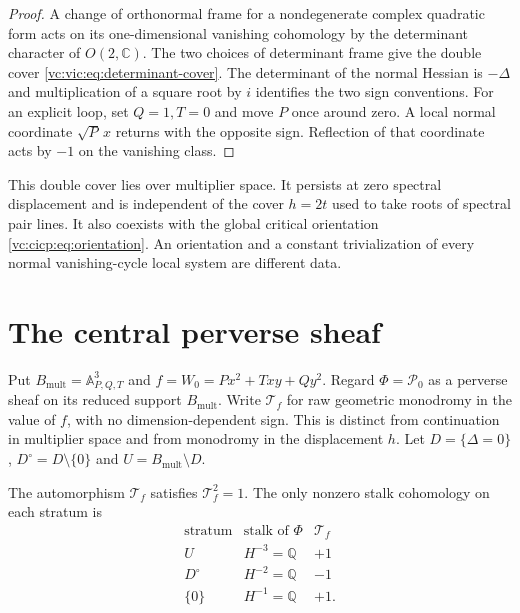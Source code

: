 \begin{proof}
A change of orthonormal frame for a nondegenerate complex
quadratic form acts on its one-dimensional vanishing
cohomology by the determinant character of $O(2,\mathbb C)$.
The two choices of determinant frame give the double cover
\eqref{vc:vic:eq:determinant-cover}. The determinant of the
normal Hessian is $-\Delta$ and multiplication of a square
root by $i$ identifies the two sign conventions.
For an explicit loop, set $Q=1,T=0$ and move $P$ once
around zero. A local normal coordinate $\sqrt P\,x$
returns with the opposite sign. Reflection of that coordinate
acts by $-1$ on the vanishing class.
\end{proof}

This double cover lies over multiplier space. It persists
at zero spectral displacement and is independent of the
cover $h=2t$ used to take roots of spectral pair lines.
It also coexists with the global critical orientation
\eqref{vc:cicp:eq:orientation}. An orientation and a constant
trivialization of every normal vanishing-cycle local system
are different data.

\section{The central perverse sheaf}
\label{vc:sec:central-sheaf}

Put $B_{\mathrm{mult}}=\mathbb A^3_{P,Q,T}$ and
$f=W_0=Px^2+Txy+Qy^2$. Regard
$\Phi=\mathcal P_0$ as a perverse sheaf on its reduced
support $B_{\mathrm{mult}}$.
Write $\mathcal T_f$ for raw geometric monodromy in the
value of $f$, with no dimension-dependent sign.
This is distinct from continuation in multiplier space
and from monodromy in the displacement $h$.
Let $D=\{\Delta=0\}$,
$D^\circ=D\setminus\{0\}$ and
$U=B_{\mathrm{mult}}\setminus D$.

\begin{lemma}\label{vc:cqm:lem:function-monodromy}
The automorphism $\mathcal T_f$ satisfies $\mathcal T_f^2=1$.
The only nonzero stalk cohomology on each stratum is
\begin{equation}\label{vc:cqm:eq:stalks}
\begin{array}{c|c|c}
 \text{stratum}&\text{stalk of }\Phi&\mathcal T_f\\ \hline
 U&H^{-3}=\mathbb Q&+1\\
 D^\circ&H^{-2}=\mathbb Q&-1\\
 \{0\}&H^{-1}=\mathbb Q&+1.
\end{array}
\end{equation}
\end{lemma}

